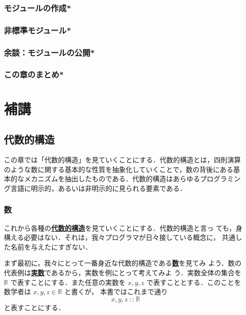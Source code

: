 \documentclass[a5paper,twoside,fleqn]{jsbook}
\newenvironment{leader}{\begingroup\gt}{\endgroup}
\newcommand{\keyword}[1]{{\underline{\textbf{#1}}}}
\DeclareMathOperator{\mIn}{{:\!:}}
\newcommand{\mSpecialSet}[1]{\mathbb{#1}} %
\newcommand{\mRSet}{\mSpecialSet{R}}
\begin{document}
\section{モジュールの作成*}
\section{非標準モジュール*}
\section{余談：モジュールの公開*}
\section{この章のまとめ*}

\part{補講}

\chapter{代数的構造}

\begin{leader}
この章では「代数的構造」を見ていくことにする．代数的構造とは，四則演算
のような数に関する基本的な性質を抽象化していくことで，数の背後にある基
本的なメカニズムを抽出したものである．代数的構造はあらゆるプログラミン
グ言語に明示的，あるいは非明示的に見られる要素である．
\end{leader}

\section{数}

これから各種の\keyword{代数的構造}を見ていくことにする．代数的構造と言っ
ても，身構える必要はない．それは，我々プログラマが日々接している概念に，
共通した名前を与えたにすぎない．

まず最初に，我々にとって一番身近な代数的構造である\keyword{数}を見てみ
よう．数の代表例は\keyword{実数}であるから，実数を例にとって考えてみよ
う．実数全体の集合を $\mRSet$ で表すことにする．また任意の実数を
$x,y,z$ で表すこととする．このことを数学者は $x,y,z\in\mRSet$ と書くが，
本書ではこれまで通り
\begin{equation}
x,y,z\mIn\mRSet
\end{equation}
と表すことにする．
\end{document}
